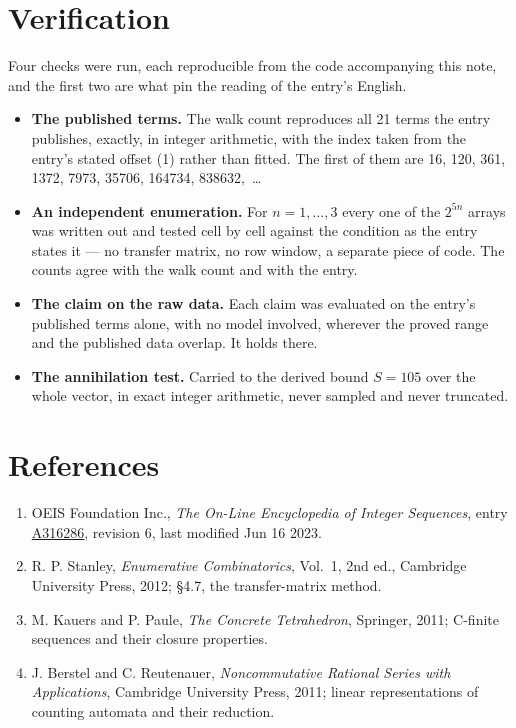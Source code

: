 \documentclass[11pt]{article}
\theoremstyle{definition}
\begin{document}
\section{Verification}

Four checks were run, each reproducible from the code accompanying this note, and the first two are what pin the reading of the entry's English.

\begin{itemize}

\item {\bfseries The published terms.} The walk count reproduces all 21 terms the entry publishes, exactly, in integer arithmetic, with the index taken from the entry's stated offset (1) rather than fitted. The first of them are 16, 120, 361, 1372, 7973, 35706, 164734, 838632,~\dots

\item {\bfseries An independent enumeration.} For $n = 1,\dots,3$ every one of the $2^{5n}$ arrays was written out and tested cell by cell against the condition as the entry states it --- no transfer matrix, no row window, a separate piece of code. The counts agree with the walk count and with the entry.

\item {\bfseries The claim on the raw data.} Each claim was evaluated on the entry's published terms alone, with no model involved, wherever the proved range and the published data overlap. It holds there.

\item {\bfseries The annihilation test.} Carried to the derived bound $S = 105$ over the whole vector, in exact integer arithmetic, never sampled and never truncated.

\end{itemize}

\section{References}

\begin{enumerate}

\item OEIS Foundation Inc., \emph{The On-Line Encyclopedia of Integer Sequences}, entry \href{https://oeis.org/A316286}{A316286}, revision 6, last modified Jun 16 2023.

\item R. P. Stanley, \emph{Enumerative Combinatorics}, Vol.~1, 2nd ed., Cambridge University Press, 2012; \S4.7, the transfer-matrix method.

\item M. Kauers and P. Paule, \emph{The Concrete Tetrahedron}, Springer, 2011; C-finite sequences and their closure properties.

\item J. Berstel and C. Reutenauer, \emph{Noncommutative Rational Series with Applications}, Cambridge University Press, 2011; linear representations of counting automata and their reduction.

\end{enumerate}
\end{document}
